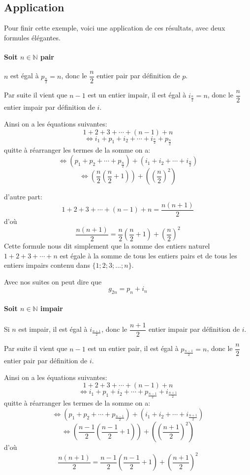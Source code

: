 \documentclass[french]{book}
\newcommand{\N}{\mathbb {N}}
\begin{document}
\newpage

\subsection*{Application}
Pour finir cette exemple, voici une application de ces résultats, avec deux formules élégantes. 

 \paragraph*{Soit $n \in \N$ pair}
 
$n$ est égal à $p_{\frac{n}{2}}=n$, donc le  $\dfrac{n}{2}$ entier pair par définition de $p$.
\par Par suite il vient que $n-1$ est un entier impair, il est égal à $i_{\frac{n}{2}}=n$, donc le  $\dfrac{n}{2}$ entier impair par définition de $i$.

Ainsi on a les équations suivantes:
$$1+2+3+\cdots+(n-1)+n$$
$$\Longleftrightarrow i_1+ p_1+ i_2 + \cdots + i_{\frac{n}{2}} + p_{\frac{n}{2}}$$
quitte à réarranger les termes de la somme on a:
$$\Longleftrightarrow (p_1+p_2+\cdots+p_{\frac{n}{2}}) + (i_1+ i_2 + \cdots + i_{\frac{n}{2}})$$
$$\Longleftrightarrow (\dfrac{n}{2}(\dfrac{n}{2}+1))+ ( (\dfrac{n}{2})^2)$$

d'autre part: 
$$1+2+3+\cdots+(n-1)+n=\dfrac{n(n+1)}{2}$$
d'où 
$$\dfrac{n(n+1)}{2} =\dfrac{n}{2}(\dfrac{n}{2}+1) +  (\dfrac{n}{2})^2 $$
Cette formule nous dit simplement que la somme des entiers naturel $1+2+3+\cdots+n$ est égale à la somme de tous les entiers pairs et de tous les entiers impairs contenu dans $\{1;2;3;...;n\}$.


Avec nos suites on peut dire que $$g_{2n}=p_{n}+i_{n}$$

\paragraph*{Soit $n \in \N$ impair}

Si $n$ est impair, il est égal à $i_{\frac{n+1}{2}}$, donc le  $\dfrac{n+1}{2}$ entier impair par définition de $i$.
\par Par suite il vient que $n-1$ est un entier pair, il est égal à $p_{\frac{n-1}{2}}=n$, donc le  $\dfrac{n}{2}$ entier pair par définition de $i$.

Ainsi on a les équations suivantes:
$$1+2+3+\cdots+(n-1)+n$$
$$\Longleftrightarrow i_1+ p_1+ i_2 + \cdots + p_{\frac{n-1}{2}} + i_{\frac{n+1}{2}}$$
quitte à réarranger les termes de la somme on a:
$$\Longleftrightarrow (p_1+p_2+\cdots+p_{\frac{n-1}{2}}) + (i_1+ i_2 + \cdots + i_{\frac{n+1}{2}})$$
$$\Longleftrightarrow (\dfrac{n-1}{2}(\dfrac{n-1}{2}+1))+ ( (\dfrac{n+1}{2})^2)$$
d'où 
$$\dfrac{n(n+1)}{2} =\dfrac{n-1}{2}(\dfrac{n-1}{2}+1) +  (\dfrac{n+1}{2})^2 $$
\end{document}
